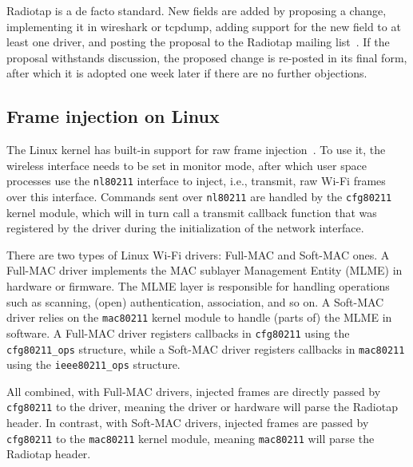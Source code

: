 \documentclass[sigconf]{acmart}
\newcommand{\wifi}{\mbox{Wi-Fi}}
\newcommand{\red}[1]{\textcolor{red}{#1}}
\begin{document}

Radiotap is a de facto standard.
New fields are added by proposing a change, implementing it in wireshark or tcpdump, adding support for the new field to at least one driver, and posting the proposal to the Radiotap mailing list~\cite{radiotap}.
If the proposal withstands discussion, the proposed change is re-posted in its final form, after which it is adopted one week later if there are no further objections.

\subsection{Frame injection on Linux}
\label{sec:back:injectlinux}

%

The Linux kernel has built-in support for raw frame injection~\cite{linux-injection}.
To use it, the wireless interface needs to be set in monitor mode, after which user space processes use the \verb|nl80211| interface to inject, i.e., transmit, raw \wifi{} frames over this interface.
Commands sent over \verb|nl80211| are handled by the \verb|cfg80211| kernel module,
which will in turn call a transmit callback function that was registered by the driver during the initialization of the network interface.

There are two types of Linux \wifi{} drivers: Full-MAC and Soft-MAC ones.
A Full-MAC driver implements the MAC sublayer Management Entity (MLME) in hardware or firmware.
The MLME layer is responsible for handling operations such as scanning, (open) authentication, association, and so on.
A Soft-MAC driver relies on the \verb|mac80211| kernel module to handle (parts of) the MLME in software.
A Full-MAC driver registers callbacks in \verb|cfg80211| using the \verb|cfg80211_ops| structure, while a Soft-MAC driver registers callbacks in \verb|mac80211| using the \verb|ieee80211_ops| structure.

All combined, with Full-MAC drivers,
injected frames are directly passed by \verb|cfg80211| to the driver, meaning the driver or hardware will parse the Radiotap header.
In contrast, with Soft-MAC drivers, injected frames are passed by \verb|cfg80211| to the \verb|mac80211| kernel module, meaning \verb|mac80211| will parse the Radiotap header.
\end{document}
